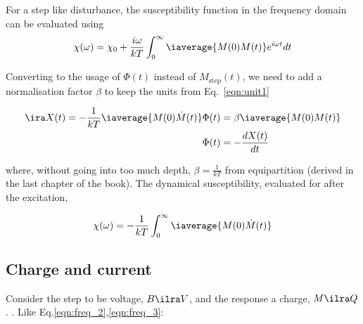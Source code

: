 \begin{framed}\noindent
  For  a step  like disturbance,  the  susceptibility function  in the  frequency
  domain can be evaluated using
  \begin{equation}\label{eqn:susceptibility_from_response}
    \chi(\omega) = \chi_0 + \frac{i\omega}{kT}\int_{0}^\infty\iaverage{M(0)M(t)}e^{i\omega t}dt
  \end{equation}

\end{framed}

\noindent Converting to the usage of $ \Phi(t) $ instead of $ M_\text{step}(t) $,
we  need  to add  a  normalisation  factor  $ \beta  $  to  keep the  units  from
Eq.~\eqref{eqn:unit1}

\begin{equation}\label{key}
  \begin{aligned} \ira X(t) = -\frac{1}{kT}\iaverage{M(0)\dot{M}(t)}
    \Phi(t) &= \beta\iaverage{M(0)M(t)}\\
    \Phi(t) &= -\frac{dX(t)}{dt}
  \end{aligned}
\end{equation}

\noindent where, without going into too much depth, $ \beta = \frac{1}{kT} $ from
equipartition  (derived  in  the  last  chapter  of  the  book).   The  dynamical
susceptibility, evaluated for after the excitation,

\begin{framed}\noindent
  \begin{equation}\label{eqn:onsager_1}
    \chi(\omega) =
    -\frac{1}{kT}\int_{0}^{\infty}\iaverage{M(0)\dot{M}(t)} %
  \end{equation}

\end{framed}

 \subsection{Charge and current}
 Consider the  step to  be voltage, $  B \ilra  V $, and  the response  a charge,
 $  M   \ilra  Q  $.    \textbf{}.   Like
 Eq.\eqref{eqn:freq_2},\eqref{eqn:freq_3}:

